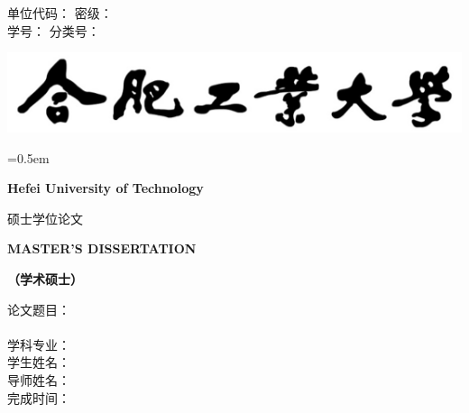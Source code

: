 \begin{titlepage}
{
\heiti 单位代码：\underlineFixlen[3.5cm]{} \hfill 
{\heiti 密\hspace{1.3em}级：\underlineFixlen[3.5cm]{\privacy}} \\
\heiti 学\hspace{2em}号：\underlineFixlen[3.5cm]{\studentID} \hfill
{\heiti 分类号：\underlineFixlen[3.5cm]{}}	
}

\centering
{\vspace{1.7cm} \includegraphics{images/hfut_name.png}\vspace{0.3cm}}

{
\parskip=0.5em
\linespread{1.25}

{\LARGE \bfseries Hefei University of Technology}\vspace{1cm}

{\chuhao \heiti 硕士学位论文}\vspace{0.7cm}

{\LARGE  \bfseries MASTER'S DISSERTATION}\vspace{0.4cm}

{\LARGE \bfseries （学术硕士）}\vspace{3cm}

}


{
\linespread{1.6}
\songti \sanhao
	{论文题目：}\underlineFixlen[8.8cm]{\titleCna}\\
	{\hspace{4.8em}} \underlineFixlen[8.8cm]{\titleCnb}\\
	{学科专业：}\underlineFixlen[8.8cm]{\major}\\
	{学生姓名：}\underlineFixlen[8.8cm]{\studentNameCn}\\
	{导师姓名：}\underlineFixlen[8.8cm]{\supervisor}\\
	{完成时间：}\\
}


\end{titlepage}
